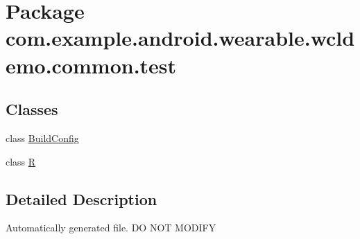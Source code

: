 \hypertarget{namespacecom_1_1example_1_1android_1_1wearable_1_1wcldemo_1_1common_1_1test}{}\section{Package com.\+example.\+android.\+wearable.\+wcldemo.\+common.\+test}
\label{namespacecom_1_1example_1_1android_1_1wearable_1_1wcldemo_1_1common_1_1test}
\subsection*{Classes}
\begin{DoxyCompactItemize}
\item 
class \hyperlink{classcom_1_1example_1_1android_1_1wearable_1_1wcldemo_1_1common_1_1test_1_1BuildConfig}{Build\+Config}
\item 
class \hyperlink{classcom_1_1example_1_1android_1_1wearable_1_1wcldemo_1_1common_1_1test_1_1R}{R}
\end{DoxyCompactItemize}


\subsection{Detailed Description}
Automatically generated file. DO N\+OT M\+O\+D\+I\+FY 